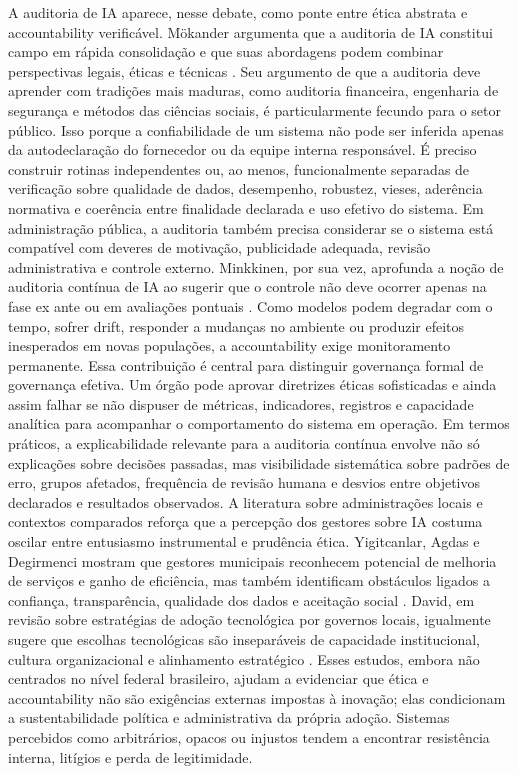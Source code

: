 \documentclass[12pt,a4paper]{article}
\begin{document}
A auditoria de IA aparece, nesse debate, como ponte entre ética abstrata e accountability verificável. Mökander argumenta que a auditoria de IA constitui campo em rápida consolidação e que suas abordagens podem combinar perspectivas legais, éticas e técnicas \autocite{mkander2023auditing}. Seu argumento de que a auditoria deve aprender com tradições mais maduras, como auditoria financeira, engenharia de segurança e métodos das ciências sociais, é particularmente fecundo para o setor público. Isso porque a confiabilidade de um sistema não pode ser inferida apenas da autodeclaração do fornecedor ou da equipe interna responsável. É preciso construir rotinas independentes ou, ao menos, funcionalmente separadas de verificação sobre qualidade de dados, desempenho, robustez, vieses, aderência normativa e coerência entre finalidade declarada e uso efetivo do sistema. Em administração pública, a auditoria também precisa considerar se o sistema está compatível com deveres de motivação, publicidade adequada, revisão administrativa e controle externo.
Minkkinen, por sua vez, aprofunda a noção de auditoria contínua de IA ao sugerir que o controle não deve ocorrer apenas na fase ex ante ou em avaliações pontuais \autocite{minkkinen2022continuous}. Como modelos podem degradar com o tempo, sofrer drift, responder a mudanças no ambiente ou produzir efeitos inesperados em novas populações, a accountability exige monitoramento permanente. Essa contribuição é central para distinguir governança formal de governança efetiva. Um órgão pode aprovar diretrizes éticas sofisticadas e ainda assim falhar se não dispuser de métricas, indicadores, registros e capacidade analítica para acompanhar o comportamento do sistema em operação. Em termos práticos, a explicabilidade relevante para a auditoria contínua envolve não só explicações sobre decisões passadas, mas visibilidade sistemática sobre padrões de erro, grupos afetados, frequência de revisão humana e desvios entre objetivos declarados e resultados observados.
A literatura sobre administrações locais e contextos comparados reforça que a percepção dos gestores sobre IA costuma oscilar entre entusiasmo instrumental e prudência ética. Yigitcanlar, Agdas e Degirmenci mostram que gestores municipais reconhecem potencial de melhoria de serviços e ganho de eficiência, mas também identificam obstáculos ligados a confiança, transparência, qualidade dos dados e aceitação social \autocite{yiitcanlar2022artificial}. David, em revisão sobre estratégias de adoção tecnológica por governos locais, igualmente sugere que escolhas tecnológicas são inseparáveis de capacidade institucional, cultura organizacional e alinhamento estratégico \autocite{david2023understanding}. Esses estudos, embora não centrados no nível federal brasileiro, ajudam a evidenciar que ética e accountability não são exigências externas impostas à inovação; elas condicionam a sustentabilidade política e administrativa da própria adoção. Sistemas percebidos como arbitrários, opacos ou injustos tendem a encontrar resistência interna, litígios e perda de legitimidade.
\end{document}

